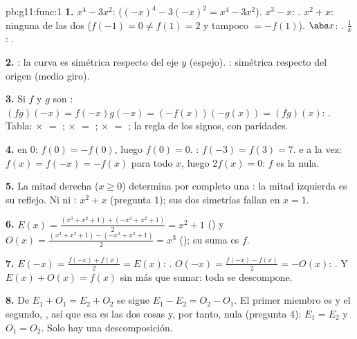 \begin{solution}{pb:g11:func:1}
\textbf{1.} $x^4 - 3x^2$:  ($(-x)^4 - 3(-x)^2 = x^4 - 3x^2$).
$x^3 - x$: . $x^2 + x$: ninguna de las dos ($f(-1) = 0 \neq
f(1) = 2$ y tampoco $= -f(1)$). $\abs x$: . $\frac1x$: .

\textbf{2.} : la curva es simétrica respecto del eje $y$ (espejo).
: simétrica respecto del origen (medio giro).

\textbf{3.} Si $f$ y $g$ son :
$(fg)(-x) = f(-x)g(-x) = (-f(x))(-g(x)) = (fg)(x)$: . Tabla: 
$\times$  $=$ ;  $\times$  $=$ ;  $\times$ 
$=$ ; la regla de los signos, con paridades.

\textbf{4.}  en $0$: $f(0) = -f(0)$, luego $f(0) = 0$. :
$f(-3) = f(3) = 7$.  e  a la vez: $f(x) = f(-x) = -f(x)$ para todo
$x$, luego $2f(x) = 0$: $f$ es la  nula.

\textbf{5.} La mitad derecha ($x \geq 0$) determina por completo una
: la mitad izquierda es su reflejo. Ni  ni :
$x^2 + x$ (pregunta 1); sus dos simetrías fallan en $x = 1$.

\textbf{6.} $E(x) = \frac{(x^3 + x^2 + 1) + (-x^3 + x^2 + 1)}{2} =
x^2 + 1$ () y $O(x) = \frac{(x^3 + x^2 + 1) - (-x^3 + x^2 + 1)}{2} =
x^3$ (); su suma es $f$.

\textbf{7.} $E(-x) = \frac{f(-x) + f(x)}{2} = E(x)$: .
$O(-x) = \frac{f(-x) - f(x)}{2} = -O(x)$: . Y
$E(x) + O(x) = f(x)$ sin más que sumar: toda  se descompone.

\textbf{8.} De $E_1 + O_1 = E_2 + O_2$ se sigue $E_1 - E_2 = O_2 - O_1$.
El primer miembro es  y el segundo, , así que esa  es las
dos cosas y, por tanto, nula (pregunta 4): $E_1 = E_2$ y $O_1 = O_2$. Solo
hay una descomposición.


\end{solution}
